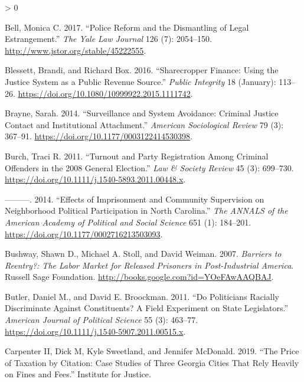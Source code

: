 \documentclass[
  12pt,
]{article}
\newlength{\cslhangindent}
\newenvironment{CSLReferences}[2] %
 {%
  \setlength{\parindent}{0pt}
  \ifodd #1 \everypar{\setlength{\hangindent}{\cslhangindent}}\ignorespaces\fi
  \ifnum #2 > 0
  \setlength{\parskip}{#2\baselineskip}
  \fi
 }%
 {}
\begin{document}
\hypertarget{refs}{}
\begin{CSLReferences}{1}{0}
\leavevmode\hypertarget{ref-Bell2017}{}%
Bell, Monica C. 2017. {``Police {Reform} and the {Dismantling} of {Legal Estrangement}.''} \emph{The Yale Law Journal} 126 (7): 2054--150. \url{http://www.jstor.org/stable/45222555}.

\leavevmode\hypertarget{ref-Blessett2016}{}%
Blessett, Brandi, and Richard Box. 2016. {``Sharecropper {Finance}: {Using} the {Justice System} as a {Public Revenue Source}.''} \emph{Public Integrity} 18 (January): 113--26. \url{https://doi.org/10.1080/10999922.2015.1111742}.

\leavevmode\hypertarget{ref-Brayne2014}{}%
Brayne, Sarah. 2014. {``Surveillance and {System Avoidance}: {Criminal Justice Contact} and {Institutional Attachment}.''} \emph{American Sociological Review} 79 (3): 367--91. \url{https://doi.org/10.1177/0003122414530398}.

\leavevmode\hypertarget{ref-Burch2011}{}%
Burch, Traci R. 2011. {``Turnout and {Party Registration} Among {Criminal Offenders} in the 2008 {General Election}.''} \emph{Law \& Society Review} 45 (3): 699--730. \url{https://doi.org/10.1111/j.1540-5893.2011.00448.x}.

\leavevmode\hypertarget{ref-Burch2014}{}%
---------. 2014. {``Effects of {Imprisonment} and {Community Supervision} on {Neighborhood Political Participation} in {North Carolina}.''} \emph{The ANNALS of the American Academy of Political and Social Science} 651 (1): 184--201. \url{https://doi.org/10.1177/0002716213503093}.

\leavevmode\hypertarget{ref-Bushway2007}{}%
Bushway, Shawn D., Michael A. Stoll, and David Weiman. 2007. \emph{Barriers to {Reentry}?: {The Labor Market} for {Released Prisoners} in {Post}-{Industrial America}}. {Russell Sage Foundation}. \url{http://books.google.com?id=YOeFAwAAQBAJ}.

\leavevmode\hypertarget{ref-Butler2011}{}%
Butler, Daniel M., and David E. Broockman. 2011. {``Do {Politicians Racially Discriminate Against Constituents}? {A Field Experiment} on {State Legislators}.''} \emph{American Journal of Political Science} 55 (3): 463--77. \url{https://doi.org/10.1111/j.1540-5907.2011.00515.x}.

\leavevmode\hypertarget{ref-CarpenterII2019}{}%
Carpenter II, Dick M, Kyle Sweetland, and Jennifer McDonald. 2019. {``The {Price} of {Taxation} by {Citation}: {Case Studies} of {Three Georgia Cities That Rely Heavily} on {Fines} and {Fees}.''} {Institute for Justice}.


\end{CSLReferences}
\end{document}
